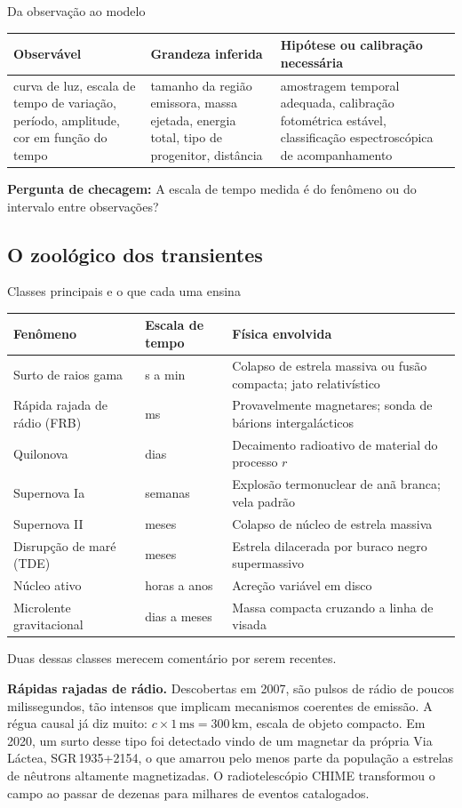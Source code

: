 \documentclass[11pt,a4paper]{article}
\newcommand{\observaveis}[4]{%
  \begin{lessonblock}[borderline west={2pt}{0pt}{astroBlue}]{Da observação ao modelo}%
  \begin{tabular}{>{\raggedright\arraybackslash}p{0.27\textwidth}>{\raggedright\arraybackslash}p{0.27\textwidth}>{\raggedright\arraybackslash}p{0.34\textwidth}}
  \toprule
  Observável & Grandeza inferida & Hipótese ou calibração necessária \\
  \midrule
  #1 & #2 & #3 \\
  \bottomrule
  \end{tabular}

  \textbf{Pergunta de checagem:} #4
  \end{lessonblock}
}
\begin{document}
\observaveis{curva de luz, escala de tempo de variação, período, amplitude, cor em função do tempo}{tamanho da região emissora, massa ejetada, energia total, tipo de progenitor, distância}{amostragem temporal adequada, calibração fotométrica estável, classificação espectroscópica de acompanhamento}{A escala de tempo medida é do fenômeno ou do intervalo entre observações?}

\subsection*{O zoológico dos transientes}

\begin{lessonblock}{Classes principais e o que cada uma ensina}
\begin{tabular}{>{\raggedright\arraybackslash}p{}>{\raggedright\arraybackslash}p{}>{\raggedright\arraybackslash}p{}}
\toprule
Fenômeno & Escala de tempo & Física envolvida \\
\midrule
Surto de raios gama & s a min & Colapso de estrela massiva ou fusão compacta; jato relativístico \\
Rápida rajada de rádio (FRB) & ms & Provavelmente magnetares; sonda de bárions intergalácticos \\
Quilonova & dias & Decaimento radioativo de material do processo $r$ \\
Supernova Ia & semanas & Explosão termonuclear de anã branca; vela padrão \\
Supernova II & meses & Colapso de núcleo de estrela massiva \\
Disrupção de maré (TDE) & meses & Estrela dilacerada por buraco negro supermassivo \\
Núcleo ativo & horas a anos & Acreção variável em disco \\
Microlente gravitacional & dias a meses & Massa compacta cruzando a linha de visada \\
\bottomrule
\end{tabular}
\end{lessonblock}

Duas dessas classes merecem comentário por serem recentes.

\textbf{Rápidas rajadas de rádio.} Descobertas em 2007, são pulsos de rádio de poucos milissegundos, tão intensos que implicam mecanismos coerentes de emissão. A régua causal já diz muito: $c\times1\,\mathrm{ms}=300\,\mathrm{km}$, escala de objeto compacto. Em 2020, um surto desse tipo foi detectado vindo de um magnetar da própria Via Láctea, SGR\,1935+2154, o que amarrou pelo menos parte da população a estrelas de nêutrons altamente magnetizadas. O radiotelescópio CHIME transformou o campo ao passar de dezenas para milhares de eventos catalogados.
\end{document}
